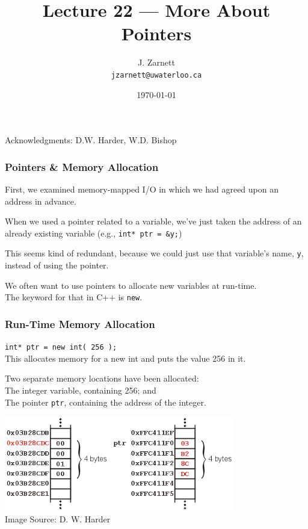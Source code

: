 

\title{Lecture 22 --- More About Pointers}

\author{J. Zarnett\\
\texttt{jzarnett@uwaterloo.ca}}
\date{\today}



\begin{frame}
  \titlepage
  
  \begin{center}
  \small{Acknowledgments: D.W. Harder, W.D. Bishop}
  \end{center}
\end{frame}


\begin{frame}
\frametitle{Pointers \& Memory Allocation}
First, we examined memory-mapped I/O in which we had agreed upon an address in advance.

When we used a pointer related to a variable, we've just taken the address of an already existing variable (e.g., \texttt{int* ptr = \&y;})

This seems kind of redundant, because we could just use that variable's name, \texttt{y}, instead of using the pointer.

We often want to use pointers to allocate new variables at run-time.\\
\quad The keyword for that in C++ is \texttt{new}.

\end{frame}

\begin{frame}
\frametitle{Run-Time Memory Allocation}
\texttt{int* ptr = new int( 256 );}\\
\quad This allocates memory for a new int and puts the value 256 in it.

Two separate memory locations have been allocated:\\
\quad The integer variable, containing 256; and\\
\quad The pointer \texttt{ptr}, containing the address of the integer.

\begin{center}
\includegraphics[width=0.75\textwidth]{images/new01.png}\\
{\tiny Image Source: D. W. Harder}
\end{center}

\end{frame}

